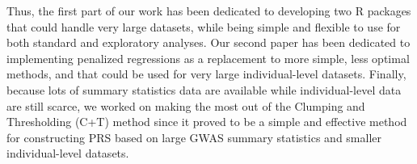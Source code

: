 Thus, the first part of our work has been dedicated to developing two R packages that could handle very large datasets, while being simple and flexible to use for both standard and exploratory analyses. 
Our second paper has been dedicated to implementing penalized regressions as a replacement to more simple, less optimal methods, and that could be used for very large individual-level datasets.
Finally, because lots of summary statistics data are available while individual-level data are still scarce, we worked on making the most out of the Clumping and Thresholding (C+T) method since it proved to be a simple and effective method for constructing PRS based on large GWAS summary statistics and smaller individual-level datasets.




